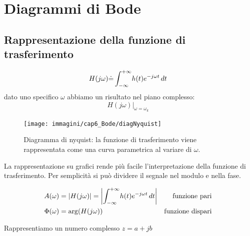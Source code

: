 
\chapter{Diagrammi di Bode}
\section{Rappresentazione della funzione di trasferimento}



\begin{equation}
	H(j\omega) \dot{=}\int_{-\infty}^{+\infty} \! h(t)e^{-j\omega t} \, d t
\end{equation}
dato uno specifico $\omega$ abbiamo un risultato nel piano complesso:
\[
	H(j\omega) \big\vert_{\omega = \omega_k}
\]

\begin{figure}[H]
	\centering
	\texttt{[image: immagini/cap6\_Bode/diagNyquist]}
	\caption{ Diagramma di nyquist: la funzione di trasferimento viene rappresentata come una curva parametrica al variare di $\omega$.  }
	\label{fig:diagNyquist}
\end{figure}

La rappresentazione su grafici rende più facile l'interpretazione della funzione di trasferimento. Per semplicità si può dividere il segnale nel modulo e nella fase.


\begin{align}
 A(\omega)&=\abs{H(j\omega)}=\Abs{\int_{-\infty}^{+\infty} \! h(t)e^{-j\omega t} \d t} &\text{funzione pari}\\	
 \Phi (\omega)&= \arg(H(j\omega)) & \text{funzione dispari}
\end{align}


Rappresentiamo un numero complesso $z=a+jb$

